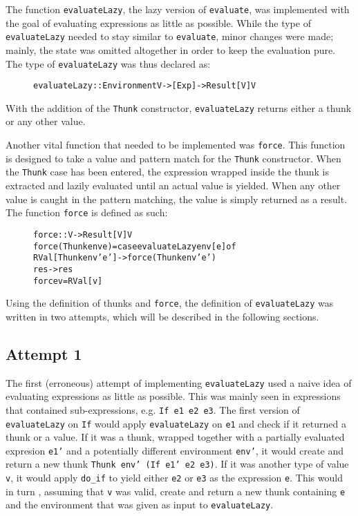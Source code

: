 The function \texttt{evaluateLazy}, the lazy version of \texttt{evaluate}, was
implemented with the goal of evaluating expressions as little as possible. While
the type of \texttt{evaluateLazy} needed to stay similar to
\texttt{evaluate}, minor changes were made; mainly, the state was omitted
altogether in order to keep the evaluation pure. The type of
\texttt{evaluateLazy} was thus declared as:

\begin{figure}[H]
\begin{alltt}
  evaluateLazy :: Environment V -> [Exp] -> Result [V] V
\end{alltt}
\end{figure}

\noindent With the addition of the \texttt{Thunk} constructor, \texttt{evaluateLazy}
returns either a thunk or any other value.

Another vital function that needed to be implemented was \texttt{force}.
This function is designed to take a value and pattern match for the
\texttt{Thunk} constructor. When the \texttt{Thunk} case has been entered,
the expression wrapped inside the thunk is extracted and lazily evaluated until
an actual value is yielded. When any other value is caught in the pattern matching,
the value is simply returned as a result. The function \texttt{force} is defined
as such:

\begin{figure}[H]
\begin{alltt}
  force :: V -> Result [V] V
  force (Thunk env e) = case evaluateLazy env [e] of
    RVal [Thunk env' e'] -> force (Thunk env' e')
    res -> res
  force v = RVal [v]
\end{alltt}
\end{figure}

Using the definition of thunks and \texttt{force}, the definition of
\texttt{evaluateLazy} was written in two attempts, which
will be described in the following sections.

\subsection{Attempt 1}
The first (erroneous) attempt of implementing \texttt{evaluateLazy} used a naive
idea of evaluating expressions as little as possible. This was mainly seen in
expressions that contained sub-expressions, e.g. \texttt{If e1 e2 e3}. The first
version of \texttt{evaluateLazy} on \texttt{If} would apply
\texttt{evaluateLazy} on \texttt{e1} and check if it returned a thunk or a
value. If it was a thunk, wrapped together with a partially evaluated expresion
\texttt{e1'} and a potentially different environment \texttt{env'}, it would
create and return a new thunk \texttt{Thunk env' (If e1' e2 e3)}. If it was
another type of value \texttt{v}, it would apply \texttt{do\_if} to yield either
\texttt{e2} or \texttt{e3} as the expression \texttt{e}. This would in turn
, assuming that \texttt{v} was valid, create and return a new thunk containing
\texttt{e} and the environment that was given as input to \texttt{evaluateLazy}.


